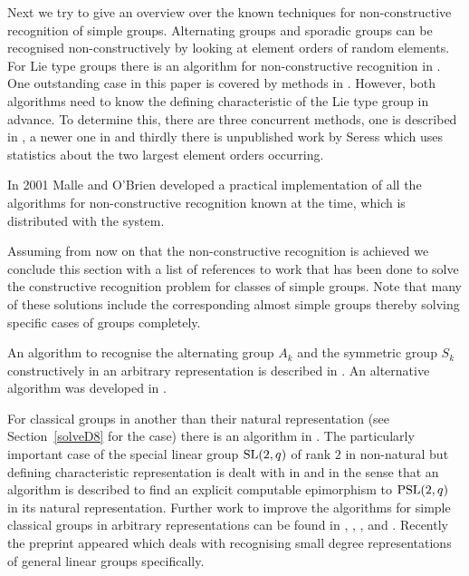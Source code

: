 Next we try to give an overview over the known techniques for
non-constructive recognition of simple groups. Alternating groups and
sporadic groups can be recognised non-constructively by looking at
element orders of random elements. For Lie type groups there is an
algorithm for non-constructive recognition in \cite{blackboxlienonconstr}.
One outstanding case in this paper is covered by methods in
\cite{altseimer}. However, both algorithms need to know the defining
characteristic of the Lie type group in advance. To determine this,
there are three concurrent methods, one is described in
\cite{primpowgraphs}, a newer one in \cite{findingcharlie} and thirdly there
is unpublished work by Seress which uses statistics about the two largest 
element orders occurring.

In 2001 Malle and O'Brien developed a practical implementation of all 
the algorithms for non-constructive recognition known at the time,
which is distributed with the {\MAGMA} system.

Assuming from now on that the non-constructive recognition is achieved we
conclude this section with a list of references to work that has been done
to solve the constructive recognition problem for classes of simple groups.
Note that many of these solutions include the corresponding almost simple
groups thereby solving specific cases of  groups completely.

An algorithm to recognise the alternating group $A_k$ and the symmetric
group $S_k$ constructively in an arbitrary 
representation is described in \cite{bbsymaltconstr}. An alternative
algorithm was developed in \cite{bratuspak}.

For classical groups in another than their natural representation (see
Section~\ref{solveD8} for the  case) there is an algorithm in
\cite{bbclassical}. The particularly important case of the special linear
group $\SL(2,q)$ of rank $2$ in non-natural but defining characteristic
representation is dealt with in \cite{classicallargefield}
and \cite{psl2qconstr} in the sense that an algorithm is described to find
an explicit computable epimorphism to $\PSL(2,q)$ in its natural
representation. Further work to improve the algorithms for simple classical 
groups in arbitrary representations can be found in \cite{bbomega},
\cite{bbunitary}, \cite{bbpsldq}, \cite{computingmatrix} and
\cite{bbortho}. Recently the preprint \cite{smalldegreegl} appeared which
deals with recognising small degree representations of general linear
groups specifically.

